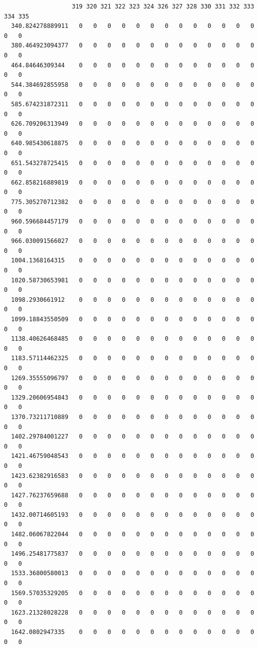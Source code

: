 \documentclass[
  letterpaper,
  DIV=11,
  numbers=noendperiod]{scrartcl}
\begin{document}
\begin{verbatim}
                   319 320 321 322 323 324 326 327 328 330 331 332 333 334 335
  340.824278889911   0   0   0   0   0   0   0   0   0   0   0   0   0   0   0
  380.464923094377   0   0   0   0   0   0   0   0   0   0   0   0   0   0   0
  464.84646309344    0   0   0   0   0   0   0   0   0   0   0   0   0   0   0
  544.384692855958   0   0   0   0   0   0   0   0   0   0   0   0   0   0   0
  585.674231872311   0   0   0   0   0   0   0   0   0   0   0   0   0   0   0
  626.709206313949   0   0   0   0   0   0   0   0   0   0   0   0   0   0   0
  640.985430618875   0   0   0   0   0   0   0   0   0   0   0   0   0   0   0
  651.543278725415   0   0   0   0   0   0   0   0   0   0   0   0   0   0   0
  662.858216889819   0   0   0   0   0   0   0   0   0   0   0   0   0   0   0
  775.305270712382   0   0   0   0   0   0   0   0   0   0   0   0   0   0   0
  960.596684457179   0   0   0   0   0   0   0   0   0   0   0   0   0   0   0
  966.030091566027   0   0   0   0   0   0   0   0   0   0   0   0   0   0   0
  1004.1368164315    0   0   0   0   0   0   0   0   0   0   0   0   0   0   0
  1020.58730653981   0   0   0   0   0   0   0   0   0   0   0   0   0   0   0
  1098.2930661912    0   0   0   0   0   0   0   0   0   0   0   0   0   0   0
  1099.18843550509   0   0   0   0   0   0   0   0   0   0   0   0   0   0   0
  1138.40626468485   0   0   0   0   0   0   0   0   0   0   0   0   0   0   0
  1183.57114462325   0   0   0   0   0   0   0   0   0   0   0   0   0   0   0
  1269.35555096797   0   0   0   0   0   0   0   0   0   0   0   0   0   0   0
  1329.20606954843   0   0   0   0   0   0   0   0   0   0   0   0   0   0   0
  1370.73211710889   0   0   0   0   0   0   0   0   0   0   0   0   0   0   0
  1402.29784001227   0   0   0   0   0   0   0   0   0   0   0   0   0   0   0
  1421.46759048543   0   0   0   0   0   0   0   0   0   0   0   0   0   0   0
  1423.62382916583   0   0   0   0   0   0   0   0   0   0   0   0   0   0   0
  1427.76237659688   0   0   0   0   0   0   0   0   0   0   0   0   0   0   0
  1432.00714605193   0   0   0   0   0   0   0   0   0   0   0   0   0   0   0
  1482.06067822044   0   0   0   0   0   0   0   0   0   0   0   0   0   0   0
  1496.25481775837   0   0   0   0   0   0   0   0   0   0   0   0   0   0   0
  1533.36800580013   0   0   0   0   0   0   0   0   0   0   0   0   0   0   0
  1569.57035329205   0   0   0   0   0   0   0   0   0   0   0   0   0   0   0
  1623.21328028228   0   0   0   0   0   0   0   0   0   0   0   0   0   0   0
  1642.0802947335    0   0   0   0   0   0   0   0   0   0   0   0   0   0   0

\end{verbatim}
\end{document}
